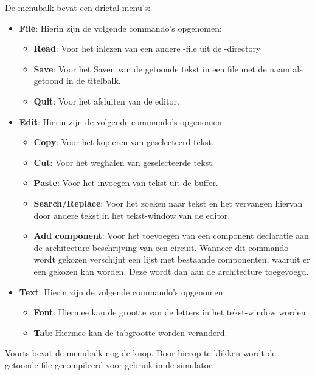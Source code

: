 De menubalk bevat een drietal menu's:
\begin{itemize}
\item {\bf File}: Hierin zijn de volgende commando's opgenomen:
            \begin{itemize}
            \item {\bf Read}: Voor het inlezen van een andere  -file uit de
             -directory
            \item {\bf Save}: Voor het Saven van de getoonde tekst in een file
              met de naam als getoond in de titelbalk.
            \item {\bf Quit}: Voor het afsluiten van de editor.
            \end{itemize}
\item {\bf Edit}: Hierin zijn de volgende commando's opgenomen:
            \begin{itemize}
            \item {\bf Copy}: Voor het kopieren van geselecteerd tekst.
            \item {\bf Cut}: Voor het weghalen van geselecteerde tekst.
            \item {\bf Paste}: Voor het invoegen van tekst uit de buffer.
            \item {\bf Search/Replace}: Voor het zoeken naar tekst en het
            vervangen hiervan door andere tekst in het tekst-window van de editor.
            \item {\bf Add component}: Voor het toevoegen van een component
            declaratie aan de architecture beschrijving van een circuit.
            Wanneer dit commando wordt gekozen verschijnt een lijst met
            bestaande componenten, waaruit er een gekozen kan worden.
            Deze wordt dan aan de architecture toegevoegd.
            \end{itemize}
\item {\bf Text}: Hierin zijn de volgende commando's opgenomen:
            \begin{itemize}
            \item {\bf Font}: Hiermee kan de grootte van de letters in het tekst-window worden
            \item {\bf Tab}: Hiermee kan de tabgrootte worden veranderd.
            \end{itemize}
\end{itemize}
Voorts bevat de menubalk nog de  knop. Door hierop te klikken
wordt de getoonde file gecompileerd voor gebruik in de simulator.\\
